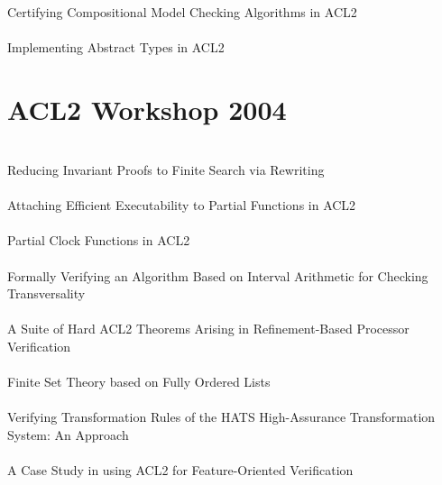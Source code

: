 \documentclass{article}
\begin{document}
\cite{03-ray-modelchecking} \\
Certifying Compositional Model Checking Algorithms in ACL2 \\

\cite{03-austel-types} \\
Implementing Abstract Types in ACL2 \\


\section{ACL2 Workshop 2004}

\cite{04-sumners-invariant} \\
Reducing Invariant Proofs to Finite Search via Rewriting \\

\cite{04-ray-partial} \\
Attaching Efficient Executability to Partial Functions in ACL2 \\

\cite{04-matthews-clock} \\
Partial Clock Functions in ACL2 \\

\cite{04-gameiro-interval} \\
Formally Verifying an Algorithm Based on Interval Arithmetic for Checking Transversality \\

\cite{04-manolios-hard} \\
A Suite of Hard ACL2 Theorems Arising in Refinement-Based Processor Verification \\

\cite{04-davis-sets} \\
Finite Set Theory based on Fully Ordered Lists \\

\cite{04-roach-hats} \\
Verifying Transformation Rules of the HATS High-Assurance Transformation System: An Approach \\

\cite{04-fisler-features} \\
A Case Study in using ACL2 for Feature-Oriented Verification \\
\end{document}
